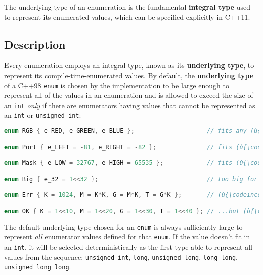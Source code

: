 
The underlying type of an enumeration is the fundamental
\textbf{integral type} used to represent its enumerated values, which
can be specified explicitly in C++11.

\subsection[Description]{Description}\label{description}

Every enumeration employs an integral type, known as its
\textbf{underlying type}, to represent its compile-time-enumerated
values. By default, the \textbf{underlying type} of a C++98
\texttt{enum} is chosen by the
implementation to be large enough to represent all of the values in an
enumeration and is allowed to exceed the size of an \texttt{int}
\emph{only} if there are enumerators having values that cannot be
represented as an \texttt{int} or \texttt{unsigned}~\texttt{int}:

\begin{lstlisting}[language=C++]
enum RGB { e_RED, e_GREEN, e_BLUE };                    // fits any (ù{\codeincomments{char}}ù)

enum Port { e_LEFT = -81, e_RIGHT = -82 };              // fits (ù{\codeincomments{signed char}}ù)

enum Mask { e_LOW = 32767, e_HIGH = 65535 };            // fits (ù{\codeincomments{unsigned short}}ù)

enum Big { e_32 = 1<<32 };                              // too big for (ù{\codeincomments{int}}ù)

enum Err { K = 1024, M = K*K, G = M*K, T = G*K };       // (ù{\codeincomments{G*K}}ù) overflows (ù{\codeincomments{int}}ù)...

enum OK { K = 1<<10, M = 1<<20, G = 1<<30, T = 1<<40 }; // ...but (ù{\codeincomments{1<<40}}ù) is OK
\end{lstlisting}

\noindent The default underlying type chosen for an \texttt{enum} is always
sufficiently large to represent \emph{all} enumerator values defined for
that \texttt{enum}. If the value doesn't fit in an \texttt{int}, it will
be selected deterministically as the first type able to represent all
values from the sequence: \texttt{unsigned}~\texttt{int}, \texttt{long},
\texttt{unsigned}~\texttt{long}, \texttt{long}~\texttt{long},
\texttt{unsigned}~\texttt{long}~\texttt{long}.

